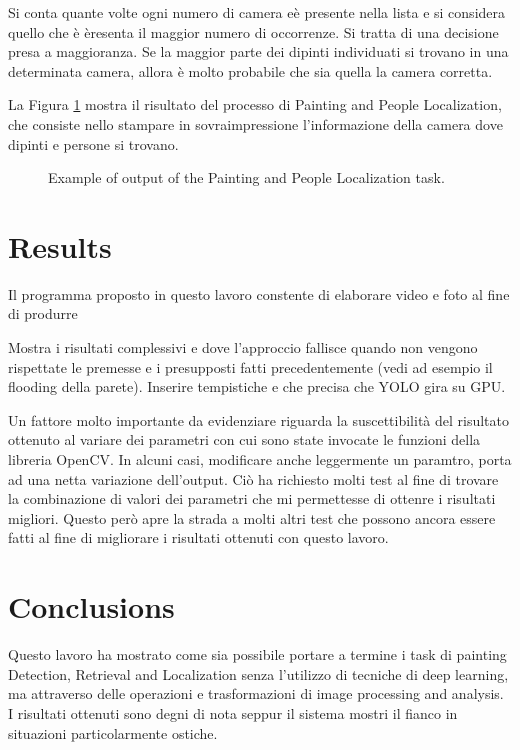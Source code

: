 \documentclass[10pt,twocolumn,letterpaper]{article}
\begin{document}
Si conta quante volte ogni numero di camera eè presente nella lista e si considera quello che è èresenta il maggior numero di occorrenze. Si tratta di una decisione presa a maggioranza. Se la maggior parte dei dipinti individuati si trovano in una determinata camera, allora è molto probabile che sia quella la camera corretta.

La Figura \ref{fig:paintingPeopleLocalization} mostra il risultato del processo di Painting and People Localization, che consiste nello stampare in sovraimpressione l'informazione della camera dove dipinti e persone si trovano.

\begin{figure}[t]
   \begin{center}
   \fbox{\rule{0pt}{2in} \rule{0.9\linewidth}{0pt}}
   \end{center}
      \caption{Example of output of the Painting and People Localization task.}
   \label{fig:paintingPeopleLocalization}
\end{figure}

\section{Results}

Il programma proposto in questo lavoro constente di elaborare video e foto al fine di produrre 


Mostra i risultati complessivi e dove l'approccio fallisce quando non vengono rispettate le premesse e i presupposti fatti precedentemente (vedi ad esempio il flooding della parete).
Inserire tempistiche e che precisa che YOLO gira su GPU.


Un fattore molto importante da evidenziare riguarda la suscettibilità del risultato ottenuto al variare dei parametri con cui sono state invocate le funzioni della libreria OpenCV. In alcuni casi, modificare anche leggermente un paramtro, porta ad una netta variazione dell'output. Ciò ha richiesto molti test al fine di trovare la combinazione di valori dei parametri che mi permettesse di ottenre i risultati migliori. Questo però apre la strada a molti altri test che possono ancora essere fatti al fine di migliorare i risultati ottenuti con questo lavoro.

\section{Conclusions}
Questo lavoro ha mostrato come sia possibile portare a termine i task di painting Detection, Retrieval and Localization senza l'utilizzo di tecniche di deep learning, ma attraverso delle operazioni e trasformazioni di image processing and analysis. I risultati ottenuti sono degni di nota seppur il sistema mostri il fianco in situazioni particolarmente ostiche.
\end{document}
